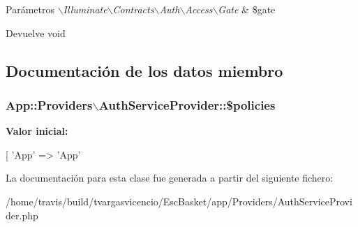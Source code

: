 \begin{DoxyParams}{\-Parámetros}
{\em $\backslash$\-Illuminate$\backslash$\-Contracts$\backslash$\-Auth$\backslash$\-Access$\backslash$\-Gate} & \$gate \\
\hline
\end{DoxyParams}
\begin{DoxyReturn}{\-Devuelve}
void 
\end{DoxyReturn}


\subsection{\-Documentación de los datos miembro}
\hypertarget{class_app_1_1_providers_1_1_auth_service_provider_a7c9a23a81b597a45f21395d5438388c8}{
\subsubsection[{\$policies}]{\setlength{\rightskip}{0pt plus 5cm}\-App\-::\-Providers$\backslash$\-Auth\-Service\-Provider\-::\$policies}}\label{class_app_1_1_providers_1_1_auth_service_provider_a7c9a23a81b597a45f21395d5438388c8}
{\bfseries \-Valor inicial\-:}
\begin{DoxyCode}
 [
        'App\Model' => 'App\Policies\ModelPolicy'
\end{DoxyCode}


\-La documentación para esta clase fue generada a partir del siguiente fichero\-:\begin{DoxyCompactItemize}
\item 
/home/travis/build/tvargasvicencio/\-Esc\-Basket/app/\-Providers/\-Auth\-Service\-Provider.\-php\end{DoxyCompactItemize}

